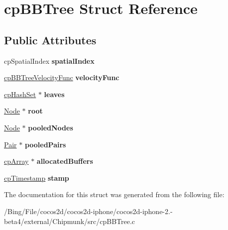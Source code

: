 \hypertarget{structcp_b_b_tree}{\section{cp\-B\-B\-Tree Struct Reference}
\label{structcp_b_b_tree}
}
\subsection*{Public Attributes}
\begin{DoxyCompactItemize}
\item 
\hypertarget{structcp_b_b_tree_a87724883548751b2fdd1cea547794ea0}{cp\-Spatial\-Index {\bfseries spatial\-Index}}\label{structcp_b_b_tree_a87724883548751b2fdd1cea547794ea0}

\item 
\hypertarget{structcp_b_b_tree_a2454d7b5f14d18432ce5708979dad40d}{\hyperlink{group__cp_spatial_index_gaa256addb4f65c6846dfc306ef62a3988}{cp\-B\-B\-Tree\-Velocity\-Func} {\bfseries velocity\-Func}}\label{structcp_b_b_tree_a2454d7b5f14d18432ce5708979dad40d}

\item 
\hypertarget{structcp_b_b_tree_a497f0c8234b989c94b7199e982df088b}{\hyperlink{structcp_hash_set}{cp\-Hash\-Set} $\ast$ {\bfseries leaves}}\label{structcp_b_b_tree_a497f0c8234b989c94b7199e982df088b}

\item 
\hypertarget{structcp_b_b_tree_a3a6925169fb75729294040ad52918de4}{\hyperlink{struct_node}{Node} $\ast$ {\bfseries root}}\label{structcp_b_b_tree_a3a6925169fb75729294040ad52918de4}

\item 
\hypertarget{structcp_b_b_tree_a69f85b9b4b1cfac73db505b482a82b65}{\hyperlink{struct_node}{Node} $\ast$ {\bfseries pooled\-Nodes}}\label{structcp_b_b_tree_a69f85b9b4b1cfac73db505b482a82b65}

\item 
\hypertarget{structcp_b_b_tree_adb0f2f6107803e64a087f38ae43bfb7b}{\hyperlink{struct_pair}{Pair} $\ast$ {\bfseries pooled\-Pairs}}\label{structcp_b_b_tree_adb0f2f6107803e64a087f38ae43bfb7b}

\item 
\hypertarget{structcp_b_b_tree_a4c7b967ca9b68bd2605f7cf7735c270b}{\hyperlink{structcp_array}{cp\-Array} $\ast$ {\bfseries allocated\-Buffers}}\label{structcp_b_b_tree_a4c7b967ca9b68bd2605f7cf7735c270b}

\item 
\hypertarget{structcp_b_b_tree_abcc1f58dcc7295d38f5d2bba29d926ad}{\hyperlink{group__basic_types_gaa24652c104082d0725066ea5ac7dc83f}{cp\-Timestamp} {\bfseries stamp}}\label{structcp_b_b_tree_abcc1f58dcc7295d38f5d2bba29d926ad}

\end{DoxyCompactItemize}


The documentation for this struct was generated from the following file\-:\begin{DoxyCompactItemize}
\item 
/\-Bing/\-File/cocos2d/cocos2d-\/iphone/cocos2d-\/iphone-\/2.-\/beta4/external/\-Chipmunk/src/cp\-B\-B\-Tree.\-c\end{DoxyCompactItemize}
